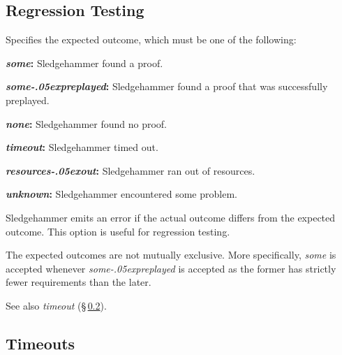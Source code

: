 \documentclass[a4paper,12pt]{article}
\let\oldS=\S
\def\S{\oldS\,}
\renewcommand\_{\hbox{\textunderscore\kern-.05ex}}
\begin{document}
\subsection{Regression Testing}
\label{regression-testing}

\begin{enum}
Specifies the expected outcome, which must be one of the following:

\begin{enum}
\item[\labelitemi] \textbf{\textit{some}:} Sledgehammer found a proof.
\item[\labelitemi] \textbf{\textit{some\_preplayed}:} Sledgehammer found a proof that was successfully preplayed.
\item[\labelitemi] \textbf{\textit{none}:} Sledgehammer found no proof.
\item[\labelitemi] \textbf{\textit{timeout}:} Sledgehammer timed out.
\item[\labelitemi] \textbf{\textit{resources\_out}:} Sledgehammer ran out of resources.
\item[\labelitemi] \textbf{\textit{unknown}:} Sledgehammer encountered some
problem.
\end{enum}

Sledgehammer emits an error if the actual outcome differs from the expected outcome. This option is
useful for regression testing.

The expected outcomes are not mutually exclusive. More specifically, \textit{some} is accepted
whenever \textit{some\_preplayed} is accepted as the former has strictly fewer requirements
than the later.

\nopagebreak
{\small See also \textit{timeout} (\S\ref{timeouts}).}
\end{enum}


\subsection{Timeouts}
\label{timeouts}
\end{document}
